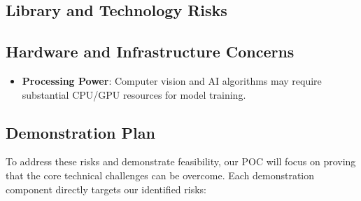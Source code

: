 \documentclass{article}
\begin{document}
\subsection{Library and Technology Risks}

\subsection{Hardware and Infrastructure Concerns}

\begin{itemize}
\item \textbf{Processing Power}: Computer vision and AI algorithms may require substantial CPU/GPU resources for model training.
\end{itemize}

\subsection{Demonstration Plan}

To address these risks and demonstrate feasibility, our POC will focus on proving that the core technical challenges can be overcome. Each demonstration component directly targets our identified risks:
\end{document}
